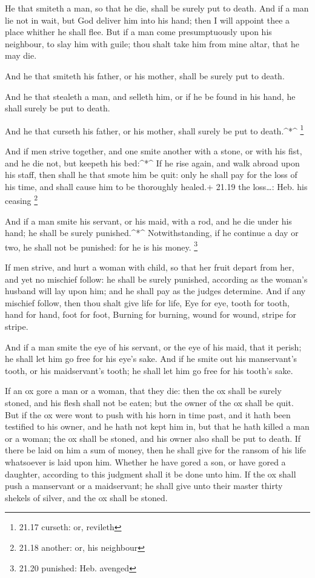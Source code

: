  He that smiteth a man, so that he die, shall be surely put
to death.  And if a man lie not in wait, but God deliver
him into his hand; then I will appoint thee a place whither he shall
flee.  But if a man come presumptuously upon his neighbour,
to slay him with guile; thou shalt take him from mine altar, that he may
die.

 And he that smiteth his father, or his mother, shall be
surely put to death.

 And he that stealeth a man, and selleth him, or if he be
found in his hand, he shall surely be put to death.

 And he that curseth his father, or his mother, shall
surely be put to death.\^{}*\^{} \footnote{21.17 curseth: or, revileth}

 And if men strive together, and one smite another with a
stone, or with his fist, and he die not, but keepeth his bed:\^{}*\^{}
 If he rise again, and walk abroad upon his staff, then
shall he that smote him be quit: only he shall pay for the loss of his
time, and shall cause him to be thoroughly healed.+ 21.19 the
loss\ldots: Heb. his ceasing \footnote{21.18 another: or, his neighbour}

 And if a man smite his servant, or his maid, with a rod,
and he die under his hand; he shall be surely punished.\^{}*\^{}
 Notwithstanding, if he continue a day or two, he shall not
be punished: for he is his money. \footnote{21.20 punished: Heb. avenged}

 If men strive, and hurt a woman with child, so that her
fruit depart from her, and yet no mischief follow: he shall be surely
punished, according as the woman's husband will lay upon him; and he
shall pay as the judges determine.  And if any mischief
follow, then thou shalt give life for life,  Eye for eye,
tooth for tooth, hand for hand, foot for foot,  Burning for
burning, wound for wound, stripe for stripe.

 And if a man smite the eye of his servant, or the eye of
his maid, that it perish; he shall let him go free for his eye's sake.
 And if he smite out his manservant's tooth, or his
maidservant's tooth; he shall let him go free for his tooth's sake.

 If an ox gore a man or a woman, that they die: then the ox
shall be surely stoned, and his flesh shall not be eaten; but the owner
of the ox shall be quit.  But if the ox were wont to push
with his horn in time past, and it hath been testified to his owner, and
he hath not kept him in, but that he hath killed a man or a woman; the
ox shall be stoned, and his owner also shall be put to death.
 If there be laid on him a sum of money, then he shall give
for the ransom of his life whatsoever is laid upon him. 
Whether he have gored a son, or have gored a daughter, according to this
judgment shall it be done unto him.  If the ox shall push a
manservant or a maidservant; he shall give unto their master thirty
shekels of silver, and the ox shall be stoned.

